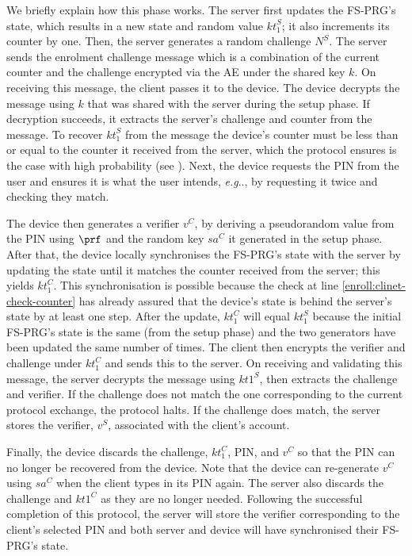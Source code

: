 \documentclass[runningheads]{llncs}
\makeatletter
\DeclareRobustCommand\onedot{\futurelet\@let@token\@onedot}
\def\@onedot{\ifx\@let@token.\else.\null\fi\xspace}
\def\eg{\emph{e.g}\onedot} \def\Eg{\emph{E.g}\onedot}
\newcommand{\sss}{\scriptscriptstyle}
\newcommand{\nonce}{\ensuremath{{N}}}
\newcommand{\keyt}{\ensuremath{{kt}}}
\newcommand{\salt}{\ensuremath{{sa}}}
\renewcommand{\verifier}{\ensuremath{{v}}}
\newcommand{\VC}[1]{\ensuremath{#1^{\sss C}}}
\newcommand{\VS}[1]{\ensuremath{#1^{\sss S}}}
\makeatother
\begin{document}
We briefly explain how this phase works.  The server first updates the FS-PRG's state, which results in a new state and random value \VS{\keyt_{\sss 1}}; it also increments its counter by one. Then, the server generates a random challenge \VS{\nonce}. The server sends the enrolment challenge message which is a combination of the current counter and the challenge encrypted via the AE under the shared key $k$.
%
 On receiving this message, the client passes it to the device. The device decrypts the message using $k$ that was shared with the server during the setup phase.  If decryption succeeds, it  extracts the server's challenge and counter from the message. To recover $\VS{\keyt_{\sss 1}}$ from the message the device's counter must be less than or equal to the counter it received from the server, which the protocol ensures is the case with high probability (see ). Next, the device requests the PIN from the user and ensures it is what the user intends, \eg, by requesting it twice and checking they match.

The device then generates a verifier $\VC{\verifier}$, by deriving a pseudorandom value from the PIN using $\prf$ and the random key $\VC{\salt}$ it generated in the setup phase.  After that, the device locally synchronises the FS-PRG's state with the server by updating the state until it matches the counter received from the server; this yields \VC{\keyt_{\sss 1}}. This synchronisation is possible because the check at line \ref{enroll:clinet-check-counter} has already assured that the device's state is behind the server's state by at least one step. After the update, \VC{\keyt_{\sss 1}} will equal \VS{\keyt_{\sss 1}} because the initial FS-PRG's state is the same (from the setup phase) and the two generators have been updated the same number of times. The client then encrypts the verifier and challenge under \VC{\keyt_{\sss 1}} and sends this to the server. 
On receiving and validating this message, the server decrypts the message using \VS{\keyt{\sss 1}}, then extracts the challenge and verifier.
If the challenge does not match the one corresponding to the current protocol exchange, the protocol halts.
If the challenge does match, the server stores the verifier, $\VS{\verifier}$,  associated with the client's account.

Finally, the device discards the challenge, \VC{\keyt_{\sss 1}}, PIN, and \VC{\verifier} so that the PIN can no longer be recovered from the device. Note that the device can re-generate \VC{\verifier} using \VC{\salt} when the client types in its PIN again. The server also discards the challenge and \VC{\keyt{\sss 1}} as they are no longer needed. Following the successful completion of this protocol, the server will store the verifier corresponding to the client's selected PIN and both server and device will have synchronised their FS-PRG's state.
\end{document}
